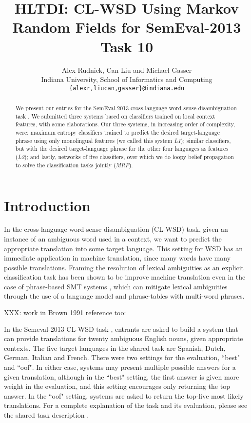 \documentclass[11pt,letterpaper]{article}
\title{HLTDI: CL-WSD Using Markov Random Fields for SemEval-2013 Task 10}
\author{Alex Rudnick, Can Liu and Michael Gasser\\
	    Indiana University, School of Informatics and Computing \\
	    {\tt \{alexr,liucan,gasser\}@indiana.edu}}
\date{}
\begin{document}
\maketitle

\begin{abstract}

We present our entries for the SemEval-2013 cross-language word-sense
disambiguation task \cite{task10}. We submitted three systems based on
classifiers trained on local context features, with some elaborations. Our
three systems, in increasing order of complexity, were: maximum entropy
classifiers trained to predict the desired target-language phrase using only
monolingual features (we called this system \emph{L1}); similar classifiers,
but with the desired target-language phrase for the other four languages as
features (\emph{L2}); and lastly, networks of five classifiers, over which we
do loopy belief propagation to solve the classification tasks jointly
(\emph{MRF}).
\end{abstract}

\section{Introduction}
In the cross-language word-sense disambiguation (CL-WSD) task, given an
instance of an ambiguous word used in a context, we want to predict the
appropriate translation into some target language. This setting for WSD has an
immediate application in machine translation, since many words have many
possible translations. Framing the resolution of lexical ambiguities as an
explicit classification task has been shown to be improve machine translation
even in the case of phrase-based SMT systems \cite{carpuatpsd}, which can
mitigate lexical ambiguities through the use of a language model and
phrase-tables with multi-word phrases.

XXX: work in Brown 1991 reference too: 
\cite{Brown91word-sensedisambiguation}

In the Semeval-2013 CL-WSD task \cite{task10}, entrants are asked to build a
system that can provide translations for twenty ambiguous English nouns, given
appropriate contexts. The five target languages in the shared task are Spanish,
Dutch, German, Italian and French. There were two settings for the evaluation,
``best" and ``oof". In either case, systems may present multiple possible
answers for a given translation, although in the ``best" setting, the first
answer is given more weight in the evaluation, and this setting encourages only
returning the top answer. In the ``oof" setting, systems are asked to
return the top-five most likely translations. For a complete explanation of the
task and its evaluation, please see the shared task description \cite{task10}.
\end{document}
